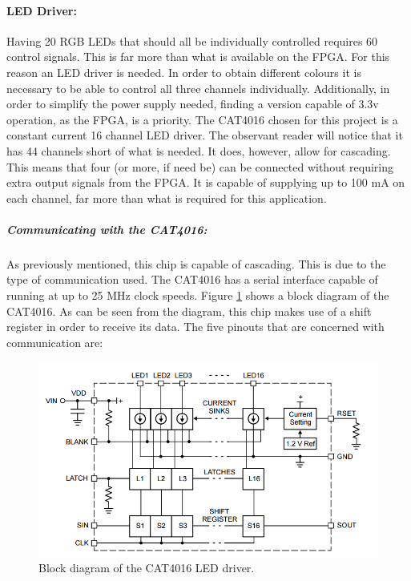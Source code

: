 \paragraph{LED Driver:}
Having 20 RGB LEDs that should all be individually controlled requires 60 control signals.
This is far more than what is available on the FPGA.
For this reason an LED driver is needed.
In order to obtain different colours it is necessary to be able to control all three channels individually. 
Additionally, in order to simplify the power supply needed, finding a version capable of 3.3v operation, as the FPGA, is a priority.
The CAT4016 chosen for this project is a constant current 16 channel LED driver.
The observant reader will notice that it has 44 channels short of what is needed.
It does, however, allow for cascading.
This means that four (or more, if need be) can be connected without requiring extra output signals from the FPGA.
It is capable of supplying up to 100 mA on each channel, far more than what is required for this application.

\subparagraph{Communicating with the CAT4016:}

As previously mentioned, this chip is capable of cascading.
This is due to the type of communication used.
The CAT4016 has a serial interface capable of running at up to 25 MHz clock speeds.
Figure \ref{fig:leddriver} shows a block diagram of the CAT4016. 
As can be seen from the diagram, this chip makes use of a shift register in order to receive its data.
The five pinouts that are concerned with communication are:

\begin{figure}[H]
	\centering
	\includegraphics[width=.75\linewidth]{images/cat4016}
	\caption{Block diagram of the CAT4016 LED driver.}
	\label{fig:leddriver}
\end{figure}

